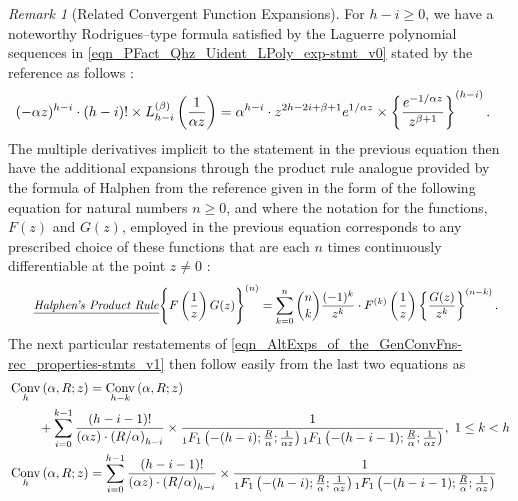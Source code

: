 \documentclass[12pt,reqno]{article}
\numberwithin{sfootnote}{section}
\numberwithin{equation}{section}
\newcommand{\tagtext}[1]{\tag*{\underline{\textit{#1}}}}
\theoremstyle{plain}
\theoremstyle{definition}
\theoremstyle{remark}
\newtheorem{remark}[theorem]{Remark}
\newcommand{\Pochhammer}[2]{\ensuremath{\left(#1\right)_{#2}}}
\newcommand{\ConvGF}[4]{\ensuremath{\Conv_{#1}\left(#2, #3; #4\right)}}
\DeclareMathOperator{\Conv}{Conv}
\begin{document}
\begin{remark}[Related Convergent Function Expansions] 
For $h-i \geq 0$, 
we have a noteworthy Rodrigues--type formula 
satisfied by the Laguerre polynomial sequences in 
\eqref{eqn_PFact_Qhz_Uident_LPoly_exp-stmt_v0} 
stated by the reference as follows \citep[\S 18.5(ii)]{NISTHB}: 
\begin{align} 
\notag 
(-\alpha z)^{h-i} \cdot (h-i)! \times 
     L_{h-i}^{(\beta)}\left(\frac{1}{\alpha z}\right) & = 
     \alpha^{h-i} \cdot z^{2h-2i+\beta+1} e^{1 / \alpha z} \times 
     \left\{ 
     \frac{e^{-1 / \alpha z}}{z^{\beta+1}} 
     \right\}^{(h-i)}. 
\end{align} 
The multiple derivatives implicit to the statement in the previous 
equation then have the additional expansions through the 
product rule analogue provided by the formula of Halphen 
from the reference given in the form of the following equation 
for natural numbers $n \geq 0$, and where the 
notation for the functions, $F(z)$ and $G(z)$, employed in the 
previous equation corresponds to any prescribed choice of these functions 
that are each $n$ times continuously differentiable at the point $z \neq 0$ 
\citep[\S 3 Exercises, p.\ 161]{ADVCOMB}: 
\begin{align*} 
\tagtext{Halphen's Product Rule} 
\Biggl\{ F\left(\frac{1}{z}\right) G(z) \Biggr\}^{(n)} & = 
     \sum_{k=0}^{n} \binom{n}{k} \frac{(-1)^{k}}{z^{k}} \cdot 
     F^{(k)}\left(\frac{1}{z}\right) 
     \left\{ \frac{G(z)}{z^{k}} \right\}^{(n-k)}. 
\end{align*} 
The next particular restatements of 
\eqref{eqn_AltExps_of_the_GenConvFns-rec_properties-stmts_v1} 
then follow easily from the last two equations as 
\begin{align} 
\notag 
& \ConvGF{h}{\alpha}{R}{z} = 
     \ConvGF{h-k}{\alpha}{R}{z} \\ 
\notag 
     & \phantom{\Conv_h } + 
     \sum_{i=0}^{k-1} 
     \frac{(h-i-1)!}{(\alpha z) \cdot \Pochhammer{R / \alpha}{h-i}} \times 
     \frac{1}{_1F_1\left(-(h-i); \frac{R}{\alpha}; \frac{1}{\alpha z}\right) 
     {_1F_1}\left(-(h-i-1); \frac{R}{\alpha}; \frac{1}{\alpha z}\right)},\ 
     1 \leq k < h \\ 
\notag 
& \ConvGF{h}{\alpha}{R}{z} = 
     \sum_{i=0}^{h-1} 
     \frac{(h-i-1)!}{(\alpha z) \cdot \Pochhammer{R / \alpha}{h-i}} \times 
     \frac{1}{_1F_1\left(-(h-i); \frac{R}{\alpha}; \frac{1}{\alpha z}\right) 
     {_1F_1}\left(-(h-i-1); \frac{R}{\alpha}; \frac{1}{\alpha z}\right)} \\ 

\end{align}
\end{remark}
\end{document}
